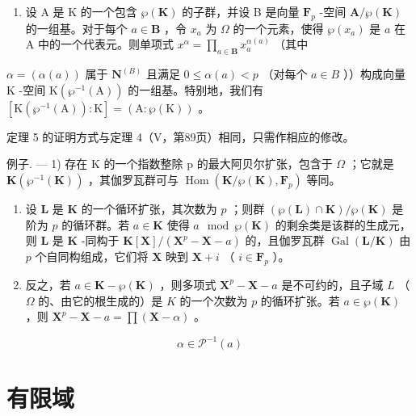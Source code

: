 \begin{enumerate}
\def\labelenumi{\alph{enumi})}
\setcounter{enumi}{2}
\tightlist
\item
  设 A 是 K 的一个包含 \(\wp(\mathbf{K})\) 的子群，并设 B 是向量 \(\mathbf{F}_{p}\) -空间 \(\mathbf{A}/\wp(\mathbf{K})\) 的一组基。对于每个 \(a \in \mathbf{B}\) ，令 \(x_{a}\) 为 \(\Omega\) 的一个元素，使得 \(\wp(x_{a})\) 是 \(a\) 在 A 中的一个代表元。则单项式 \(x^{\alpha} = \prod_{a \in \mathbf{B}} x_{a}^{\alpha(a)}\) （其中
\end{enumerate}

\(\alpha = (\alpha(a))\) 属于 \(\mathbf{N}^{(B)}\) 且满足 \(0 \leqslant \alpha(a) < p\) （对每个 \(a \in B\) ））构成向量 \(\mathrm{K}\) -空间 \(\mathrm{K}(\wp^{-1}(\mathrm{A}))\) 的一组基。特别地，我们有 \([\mathrm{K}(\wp^{-1}(\mathrm{A})): \mathrm{K}] = (\mathrm{A}: \wp(\mathrm{K}))\) 。

定理 5 的证明方式与定理 4（V，第89页）相同，只需作相应的修改。

例子. --- 1) 存在 K 的一个指数整除 p 的最大阿贝尔扩张，包含于 \(\Omega\) ；它就是 \(\mathbf{K}(\wp^{-1}(\mathbf{K}))\) ，其伽罗瓦群可与 \(\operatorname{Hom}(\mathbf{K}/\wp(\mathbf{K}), \mathbf{F}_{p})\) 等同。

\begin{enumerate}
\def\labelenumi{\arabic{enumi})}
\setcounter{enumi}{1}
\item
  设 \(\mathbf{L}\) 是 \(\mathbf{K}\) 的一个循环扩张，其次数为 \(p\) ；则群 \((\wp(\mathbf{L}) \cap \mathbf{K}) / \wp(\mathbf{K})\) 是阶为 \(p\) 的循环群。若 \(a \in \mathbf{K}\) 使得 \(a \mod \wp(\mathbf{K})\) 的剩余类是该群的生成元，则 \(\mathbf{L}\) 是 \(\mathbf{K}\) -同构于 \(\mathbf{K}[\mathbf{X}] / (\mathbf{X}^p - \mathbf{X} - a)\) 的，且伽罗瓦群 \(\operatorname{Gal}(\mathbf{L} / \mathbf{K})\) 由 \(p\) 个自同构组成，它们将 \(\mathbf{X}\) 映到 \(\mathbf{X} + i\) （ \(i \in \mathbf{F}_p\) ）。
\item
  反之，若 \(a \in \mathbf{K} - \wp(\mathbf{K})\) ，则多项式 \(\mathbf{X}^p - \mathbf{X} - a\) 是不可约的，且子域 \(L\) （ \(\Omega\) 的、由它的根生成的）是 \(K\) 的一个次数为 \(p\) 的循环扩张。若 \(a \in \wp(\mathbf{K})\) ，则 \(\mathbf{X}^p - \mathbf{X} - a = \prod (\mathbf{X} - \alpha)\) 。
\end{enumerate}

\[
\alpha \in \mathcal {P} ^ {- 1} (a)
\]

\section{有限域}

